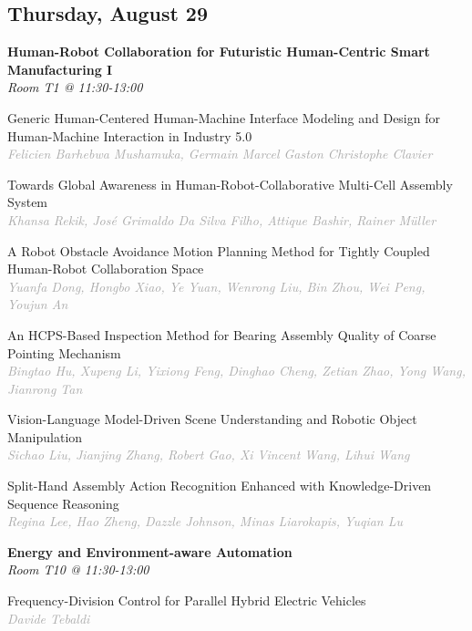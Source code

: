 \begin{multicols*}{2}
\subsection*{Thursday, August 29}

\normalsize \textbf{Human-Robot Collaboration for Futuristic Human-Centric Smart Manufacturing I}\\
\small \textit{Room T1 @ 11:30-13:00}

\small Generic Human-Centered Human-Machine Interface Modeling and Design for Human-Machine Interaction in Industry 5.0\\ 
\footnotesize \textcolor{darkgray}{\textit{Felicien Barhebwa Mushamuka, Germain Marcel Gaston Christophe  Clavier}}

\small Towards Global Awareness in Human-Robot-Collaborative Multi-Cell Assembly System\\ 
\footnotesize \textcolor{darkgray}{\textit{Khansa Rekik, José Grimaldo  Da Silva Filho, Attique  Bashir, Rainer  Müller}}

\small A Robot Obstacle Avoidance Motion Planning Method for Tightly Coupled Human-Robot Collaboration Space\\ 
\footnotesize \textcolor{darkgray}{\textit{Yuanfa Dong, Hongbo  Xiao, Ye  Yuan, Wenrong  Liu, Bin  Zhou, Wei  Peng, Youjun  An}}

\small An HCPS-Based Inspection Method for Bearing Assembly Quality of Coarse Pointing Mechanism\\ 
\footnotesize \textcolor{darkgray}{\textit{Bingtao Hu, Xupeng  Li, Yixiong  Feng, Dinghao  Cheng, Zetian  Zhao, Yong  Wang, Jianrong  Tan}}

\small Vision-Language Model-Driven Scene Understanding and Robotic Object Manipulation\\ 
\footnotesize \textcolor{darkgray}{\textit{Sichao Liu, Jianjing  Zhang, Robert  Gao, Xi Vincent  Wang, Lihui  Wang}}

\small Split-Hand Assembly Action Recognition Enhanced with Knowledge-Driven Sequence Reasoning\\ 
\footnotesize \textcolor{darkgray}{\textit{Regina Lee, Hao  Zheng, Dazzle  Johnson, Minas  Liarokapis, Yuqian  Lu}}

\normalsize \textbf{Energy and Environment-aware Automation}\\
\small \textit{Room T10 @ 11:30-13:00}

\small Frequency-Division Control for Parallel Hybrid Electric Vehicles\\ 
\footnotesize \textcolor{darkgray}{\textit{Davide Tebaldi}}


\end{multicols*}
